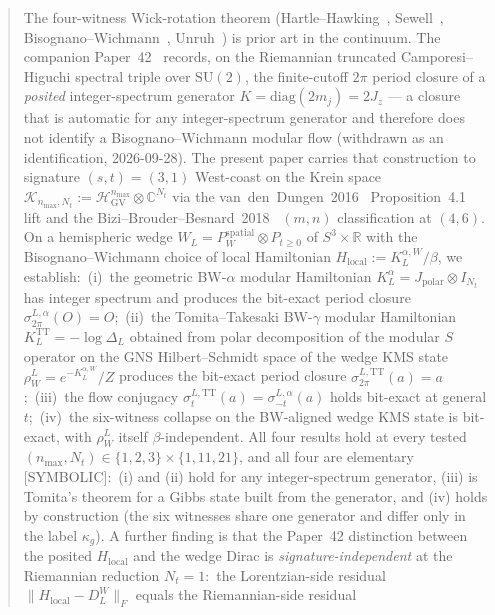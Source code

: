 \documentclass[11pt,a4paper]{article}
\theoremstyle{plain}
\theoremstyle{definition}
\newcommand{\nmax}{n_{\max}}
\newcommand{\Nt}{N_t}
\newcommand{\sthree}{S^{3}}
\newcommand{\Hilb}{\mathcal{H}}
\newcommand{\Krein}{\mathcal{K}}
\newcommand{\Frob}[1]{\lVert #1 \rVert_{F}}
\newcommand{\R}{\mathbb{R}}
\newcommand{\C}{\mathbb{C}}
\newcommand{\SU}{\mathrm{SU}}
\newcommand{\DL}{D_{L}}
\newcommand{\KL}{K_{L}}
\newcommand{\TT}{\mathrm{TT}}
\begin{document}
\begin{abstract}
\medskip
The four-witness Wick-rotation theorem
(Hartle--Hawking~\cite{hartle_hawking1976}, Sewell~\cite{sewell1982},
Bisognano--Wichmann~\cite{bisognano_wichmann1976},
Unruh~\cite{unruh1976}) is prior art in the continuum.  The companion
Paper~42~\cite{paper42} records, on the Riemannian truncated
Camporesi--Higuchi spectral triple over $\SU(2)$, the finite-cutoff
$2\pi$ period closure of a \emph{posited} integer-spectrum generator
$K = \mathrm{diag}(2m_j) = 2J_z$ --- a closure that is automatic for any
integer-spectrum generator and therefore does not identify a
Bisognano--Wichmann modular flow (withdrawn as an identification,
2026-09-28). The present paper carries that construction to
signature $(s, t) = (3, 1)$ West-coast on the Krein
space $\Krein_{\nmax, \Nt} := \Hilb_{\mathrm{GV}}^{\nmax} \otimes
\C^{\Nt}$ via the
van~den~Dungen~2016~\cite{vandungen2016} Proposition~4.1 lift and the
Bizi--Brouder--Besnard~2018~\cite{bizi_brouder_besnard2018}
$(m, n)$ classification at $(4, 6)$. On a hemispheric wedge
$W_L = P_W^{\mathrm{spatial}} \otimes P_{t \ge 0}$ of $\sthree \times
\R$ with the Bisognano--Wichmann choice of local Hamiltonian
$H_{\mathrm{local}} := \KL^{\alpha, W} / \beta$, we establish:\ (i)~the
geometric BW-$\alpha$ modular Hamiltonian $\KL^\alpha = J_{\mathrm{polar}}
\otimes I_{\Nt}$ has integer spectrum and produces the bit-exact period
closure $\sigma_{2\pi}^{L, \alpha}(O) = O$;\ (ii)~the Tomita--Takesaki
BW-$\gamma$ modular Hamiltonian $\KL^\TT = -\log \Delta_L$ obtained
from polar decomposition of the modular $S$ operator on the GNS
Hilbert--Schmidt space of the wedge KMS state $\rho_W^L = e^{-\KL^{\alpha,
W}}/Z$ produces the bit-exact period closure
$\sigma_{2\pi}^{L, \TT}(a) = a$;\ (iii)~the flow conjugacy
$\sigma_t^{L, \TT}(a) = \sigma_{-t}^{L, \alpha}(a)$ holds bit-exact at
general $t$;\ (iv)~the six-witness collapse on the BW-aligned wedge
KMS state is bit-exact, with $\rho_W^L$ itself $\beta$-independent.
All four results hold at every tested
$(\nmax, \Nt) \in \{1, 2, 3\} \times \{1, 11, 21\}$, and all four are
elementary [SYMBOLIC]:\ (i) and (ii) hold for any integer-spectrum
generator, (iii) is Tomita's theorem for a Gibbs state built from the
generator, and (iv) holds by construction (the six witnesses share one
generator and differ only in the label $\kappa_g$). A further finding
is that the Paper~42 distinction between the posited
$H_{\mathrm{local}}$ and the wedge Dirac is \emph{signature-independent}
at the Riemannian reduction $\Nt = 1$:\ the Lorentzian-side residual
$\Frob{H_{\mathrm{local}} - \DL^W}$ equals the Riemannian-side residual

\end{abstract}
\end{document}
